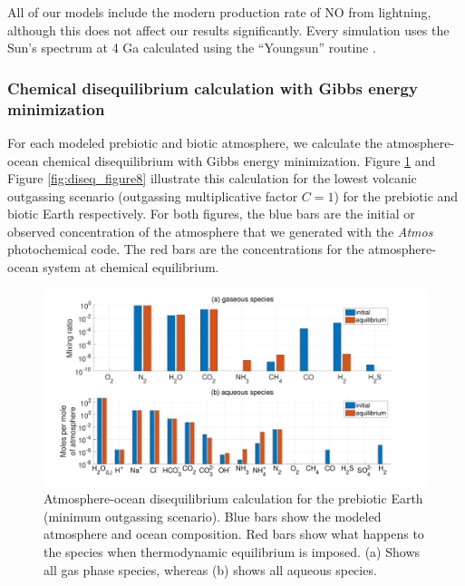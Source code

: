 All of our models include the modern production rate of NO from lightning, although this does not affect our results significantly. Every simulation uses the Sun's spectrum at 4 Ga calculated using the ``Youngsun'' routine \citep{Claire_2012}.

\subsubsection{Chemical disequilibrium calculation with Gibbs energy minimization}

For each modeled prebiotic and biotic atmosphere, we calculate the atmosphere-ocean chemical disequilibrium with Gibbs energy minimization. Figure \ref{fig:diseq_figure7} and Figure \ref{fig:diseq_figure8} illustrate this calculation for the lowest volcanic outgassing scenario (outgassing multiplicative factor $C = 1$) for the prebiotic and biotic Earth respectively. For both figures, the blue bars are the initial or observed concentration of the atmosphere that we generated with the \textit{Atmos} photochemical code. The red bars are the concentrations for the atmosphere-ocean system at chemical equilibrium.

\begin{figure}
  \centering
  \includegraphics[width=1.0\textwidth]{tex/2diseq/Figure7.pdf}
  \caption{Atmosphere-ocean disequilibrium calculation for the prebiotic Earth (minimum outgassing scenario). Blue bars show the modeled atmosphere and ocean composition. Red bars show what happens to the species when thermodynamic equilibrium is imposed. (a) Shows all gas phase species, whereas (b) shows all aqueous species.}
  \label{fig:diseq_figure7}
\end{figure}

